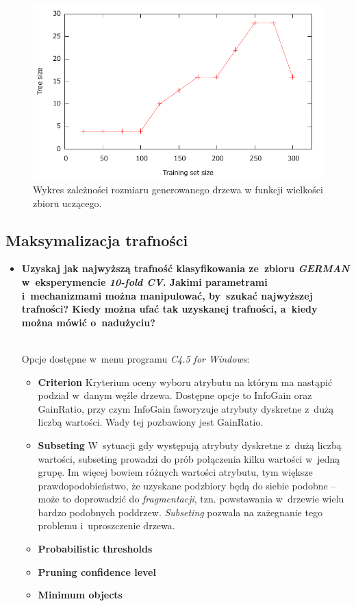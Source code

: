 \begin{itemize}
\begin{figure}	
	\includegraphics[scale=0.7]{figures/part1/task7/size.pdf}
	\caption{Wykres zależności rozmiaru generowanego drzewa w funkcji wielkości zbioru uczącego.}
	\label{p1t7-rozmiar}
\end{figure}

\end{itemize}

\subsection{Maksymalizacja trafności}

\begin{itemize}
\item \textbf{Uzyskaj jak najwyższą trafność klasyfikowania ze~zbioru \emph{GERMAN} w~eksperymencie \emph{10-fold CV}. Jakimi parametrami i~mechanizmami można manipulować, by~szukać najwyższej trafności? Kiedy można ufać tak uzyskanej trafności, a~kiedy można mówić o~nadużyciu?}

\\Opcje dostępne w~menu programu \emph{C4.5 for Windows}:
\begin{itemize}
\item \textbf{Criterion} 
Kryterium oceny wyboru atrybutu na którym ma nastąpić podział w~danym węźle drzewa. Dostępne opcje to InfoGain oraz GainRatio, przy czym InfoGain faworyzuje atrybuty dyskretne z~dużą liczbą wartości. Wady tej pozbawiony jest GainRatio.

\item \textbf{Subseting} 
W~sytuacji gdy występują atrybuty dyskretne z~dużą liczbą wartości, subseting prowadzi do prób połączenia kilku wartości w~jedną grupę. Im więcej bowiem różnych wartości atrybutu, tym większe prawdopodobieństwo, że uzyskane podzbiory będą do siebie podobne -- może to doprowadzić do \emph{fragmentacji}, tzn. powstawania w~drzewie wielu bardzo podobnych poddrzew. \emph{Subseting} pozwala na zażegnanie tego problemu i~uproszczenie drzewa.

\item \textbf{Probabilistic thresholds} 

\item \textbf{Pruning confidence level} 


\item \textbf{Minimum objects} 

\end{itemize}
\end{itemize}